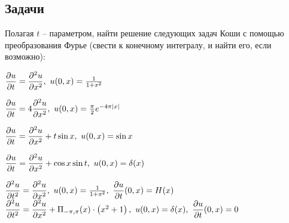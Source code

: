 \subsection{Задачи}

	Полагая $t$ -- параметром, найти решение следующих задач Коши с помощью преобразования Фурье (свести к конечному интегралу, и найти его, если возможно):
	
	\begin{enumtasks}

		\item \( \dfrac{\partial u}{\partial t} = \dfrac{\partial^{2} u}{\partial x^{2}}, ~ u(0, x) = \frac{1}{1+x^2} \)
		\item \( \dfrac{\partial u}{\partial t} = 4\dfrac{\partial^{2} u}{\partial x^{2}}, ~ u(0, x) = \frac{\pi}{2} e^{-4 \pi \left\vert x \right\vert} \)
		\item \( \dfrac{\partial u}{\partial t} = \dfrac{\partial^{2} u}{\partial x^{2}} + t\sin{x}, ~ u(0, x) = \sin{x} \)
		\item \( \dfrac{\partial u}{\partial t} = \dfrac{\partial^{2} u}{\partial x^{2}} + \cos{x} \sin{t}, ~ u(0, x) = \delta(x) \)

	\end{enumtasks}
	
	\begin{enumtasks}

		\itemstar \( \dfrac{\partial^{2} u}{\partial t^{2}} = \dfrac{\partial^{2} u}{\partial x^{2}}, ~ u(0, x) = \frac{1}{1+x^2}, ~ \dfrac{\partial u}{\partial t}(0, x) = H(x) \)
		\itemstar \( \dfrac{\partial^{2} u}{\partial t^{2}} = \dfrac{\partial^{2} u}{\partial x^{2}} + \Pi_{-\pi, \pi}(x) \cdot  \left( x^2 + 1 \right), ~ u(0, x) = \delta(x), ~ \dfrac{\partial u}{\partial t}(0, x) = 0 \)

	\end{enumtasks}